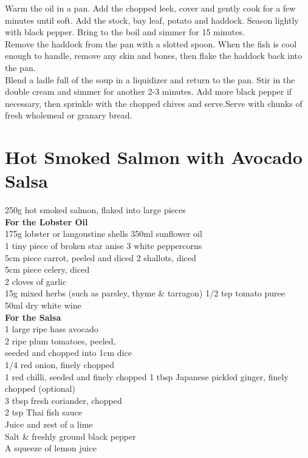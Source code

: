 \documentclass[18pt, oneside]{book}
\begin{document}
Warm the oil in a pan. Add the chopped leek, cover and gently cook for a few minutes until soft. Add the stock, bay leaf, potato and haddock. Season lightly with black pepper. Bring to the boil and simmer for 15 minutes.\\

Remove the haddock from the pan with a slotted spoon. When the fish is cool enough to handle, remove any skin and bones, then flake the haddock back into the pan. \\

Blend a ladle full of the soup in a liquidizer and return to the pan. Stir in the double cream and simmer for another 2-3 minutes. Add more black pepper if necessary, then sprinkle with the chopped chives and serve.Serve with chunks of fresh wholemeal or granary bread. \\

\section{Hot Smoked Salmon with Avocado Salsa}

250g hot smoked salmon, flaked into large pieces \\

\textbf{For the Lobster Oil } \\
175g lobster or langoustine shells 350ml sunflower oil \\
1 tiny piece of broken star anise 3 white peppercorns \\ 
5cm piece carrot, peeled and diced 2 shallots, diced \\
5cm piece celery, diced \\
2 cloves of garlic \\
15g mixed herbs (such as parsley, thyme \& tarragon) 1/2 tsp tomato puree \\
50ml dry white wine \\

\textbf{For the Salsa } \\
1 large ripe hass avocado \\
2 ripe plum tomatoes, peeled, \\
seeded and chopped into 1cm dice \\
1/4 red onion, finely chopped \\
1 red chilli, seeded and finely chopped 1 tbsp Japanese pickled ginger, finely chopped (optional) \\
3 tbsp fresh coriander, chopped \\
2 tsp Thai fish sauce \\
Juice and zest of a lime \\
Salt \& freshly ground black pepper \\
A squeeze of lemon juice \\
\end{document}
